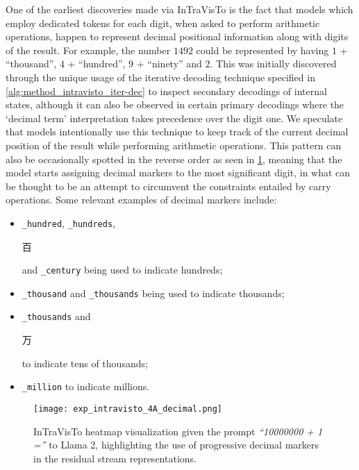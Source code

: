 One of the earliest discoveries made via InTraVisTo is the fact that models which employ dedicated tokens for each digit, when asked to perform arithmetic operations, happen to represent decimal positional information along with digits of the result.
For example, the number $1492$ could be represented by having $1$ + ``thousand'', $4$ + ``hundred'', $9$ + ``ninety'' and $2$.
This was initially discovered through the unique usage of the iterative decoding technique specified in \cref{alg:method_intravisto_iter-dec} to inspect secondary decodings of internal states, although it can also be observed in certain primary decodings where the `decimal term' interpretation takes precedence over the digit one.
We speculate that models intentionally use this technique to keep track of the current decimal position of the result while performing arithmetic operations.
This pattern can also be occasionally spotted in the reverse order as seen in \cref{fig:exp_intravisto_4_A}, meaning that the model starts assigning decimal markers to the most significant digit, in what can be thought to be an attempt to circumvent the constraints entailed by carry operations.
Some relevant examples of decimal markers include:
\begin{itemize}
    \item \texttt{\_hundred}, \texttt{\_hundreds}, \begin{CJK}{UTF8}{goth}百\end{CJK} and \texttt{\_century} being used to indicate hundreds;
    \item \texttt{\_thousand} and \texttt{\_thousands} being used to indicate thousands;
    \item \texttt{\_thousands} and \begin{CJK}{UTF8}{goth}万\end{CJK} to indicate tens of thousands;
    \item \texttt{\_million} to indicate millions.
\end{itemize}

\begin{figure}[t!]
    \centering
    \texttt{[image: exp\_intravisto\_4A\_decimal.png]}
    \caption[InTraVisTo heatmap visualization given the prompt \emph{``10000000 + 1 =''} to Llama 2.]{InTraVisTo heatmap visualization given the prompt \emph{``10000000 + 1 =''} to Llama 2, highlighting the use of progressive decimal markers in the residual stream representations.}
    \label{fig:exp_intravisto_4_A}
\end{figure}

